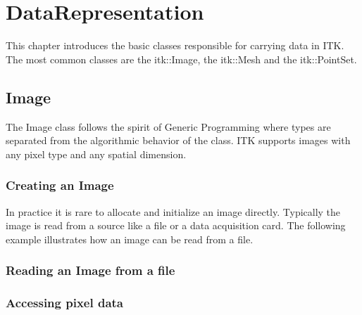 
\chapter{DataRepresentation}
\label{sec:DataRepresentation}


This chapter introduces the basic classes responsible
for carrying data in ITK. The most common classes are the
itk::Image,  the itk::Mesh and the itk::PointSet.

\section{Image}
\label{sec:ImageSection}

The Image class follows the spirit of Generic Programming where
types are separated from the algorithmic behavior of the class.
ITK supports images with any pixel type and any spatial dimension.

\subsection{Creating an Image}\label{sec:CreatingAnImageSection}

%
%


In practice it is rare to allocate and initialize an image directly.
Typically the image is read from a source like a file or a data acquisition
card. The following example illustrates how an image can be read from
a file.




\subsection{Reading an Image from a file}
\label{sec:ReadingImageFromFile}
%
%






\subsection{Accessing pixel data}
\label{sec:AccessingImagePixelData}
%
%





